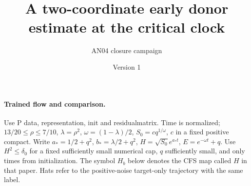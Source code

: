 \documentclass[11pt]{article}
\title{A two-coordinate early donor estimate at the critical clock}
\author{AN04 closure campaign}\date{Version 1}
\begin{document}
\maketitle
\paragraph{Trained flow and comparison.}
Use P data, representation, init and residualmatrix. Time is normalized;
$13/20\le\rho\le7/10$, $\lambda=\rho^2$, $\omega=(1-\lambda)/2$,
$S_0=cq^{1/\omega}$, $c$ in a fixed positive compact. Write
$a_*=1/2+q^2$, $b_*=\lambda/2+q^2$,
$H=\sqrt{S_0}e^{a_*t}$, $E=e^{-\omega t}+q$.
Use $H^2\le\delta_0$ for a fixed sufficiently small numerical cap,
$q$ sufficiently small, and only times from initialization. The symbol
$H_b$ below denotes the CFS map called $H$ in that paper.
Hats refer to the positive-noise target-only trajectory with the same label.
\end{document}
